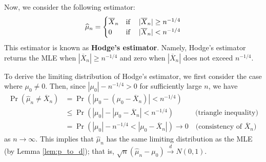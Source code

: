 \documentclass[10.5pt, A4paper, openany, uplatex]{book}
\renewcommand{\hat}{\widehat}
\renewcommand{\bar}{\overline}
\numberwithin{equation}{section}
\begin{document}
Now, we consider the following estimator:
\begin{align*}
	\hat \mu_n = \begin{cases}
		\bar X_n & \text{if \;\; $|\bar X_n| \ge n^{-1/4}$}\\
		0        & \text{if \;\; $|\bar X_n| < n^{-1/4}$}
	\end{cases}
\end{align*}
This estimator is known as \textbf{Hodge's estimator}.
Namely, Hodge's estimator returns the MLE when $|\bar X_n| \ge n^{-1/4}$ and zero when $|\bar X_n|$ does not exceed $n^{-1/4}$.

To derive the limiting distribution of Hodge's estimator, we first consider the case where $\mu_0 \neq 0$.
Then, since $|\mu_0| - n^{-1/4} > 0$ for sufficiently large $n$, we have
\begin{align*}
	\Pr(\hat \mu_n \neq \bar X_n) 
	& = \Pr(|\mu_0 - (\mu_0 - \bar X_n) | < n^{-1/4}) \\
	& \le \Pr(|\mu_0| - |\mu_0 - \bar X_n| < n^{-1/4}) \quad \quad \quad \text{(triangle inequality)}\\
	& = \Pr(|\mu_0| - n^{-1/4} < |\mu_0 - \bar X_n|) \to 0 \quad \text{(consistency of $\bar X_n$)}
\end{align*}
as $n \to \infty$.
This implies that $\hat \mu_n$ has the same limiting distribution as the MLE (by Lemma \ref{lem:p_to_d}); that is, $\sqrt{n}(\hat \mu_n - \mu_0) \overset{d}{\to} N(0, 1)$.
\end{document}
